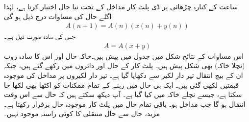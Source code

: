  ساعت کے کنارہ چڑھائی پر ڈی پلٹ کار مداخل کے تحت نیا حال اختیار کرتا ہے، لہٰذا اگلے  حال کی مساوات  درج ذیل ہو گی
\begin{align*}
A(n+1)=A(n)(x(n)+y(n))
\end{align*}
جس کی سادہ صورت ذیل ہے۔
\begin{align*}
A=A(x+y)
\end{align*}
اس مساوات  کے نتائج  شکل    میں جدول میں   پیش  ہیں۔خاکہ حال اور اس  کا سادہ روپ  (نچلا خاکہ)  بھی شکل   پیش ہیں۔ پلٹ کار کے حال  اور  دائروں میں رکھے گئے ہیں، جبکہ ان کے بیچ انتقال تیر دار لکیر سے دکھایا گیا ہے۔ تیر دار لکیروں پر مداخل  کی موجودہ قیمتیں  لکھی  گئی  ہیں۔ ایک ہی حال میں رہنے کے تمام ممکنات کو اکٹھا بھی لکھا جا سکتا ہے، جیسے نچلے خاکہ میں کیا گیا ہے۔ آپ دیکھ سکتے ہیں کہ حال  سے  اس وقت انتقال ہو گا جب مداخل   ہو۔ باقی تمام حال میں پلٹ کار موجودہ حال برقرار رکھتا ہے۔مزید، حال  سے  حال  منتقلی کا کوئی راستہ موجود نہیں۔

